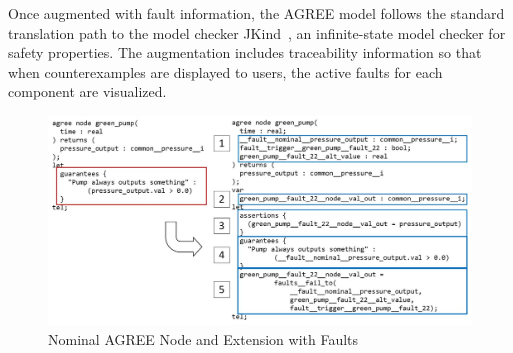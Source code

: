 
Once augmented with fault information, the AGREE model follows the standard translation path to the model checker JKind~\cite{2017arXiv171201222G}, an infinite-state model checker for safety properties.  The augmentation includes traceability information so that when counterexamples are displayed to users, the active faults for each component are visualized.

\begin{figure}[h!]
	\hspace*{-2cm}
	\vspace{-0.3in} 
	\begin{center}
		\includegraphics[scale=0.3]{images/lustre.jpg}
	\caption{Nominal AGREE Node and Extension with Faults}
		\label{fig:lustre}
	\end{center}
	\vspace{-0.3in}
\end{figure}

